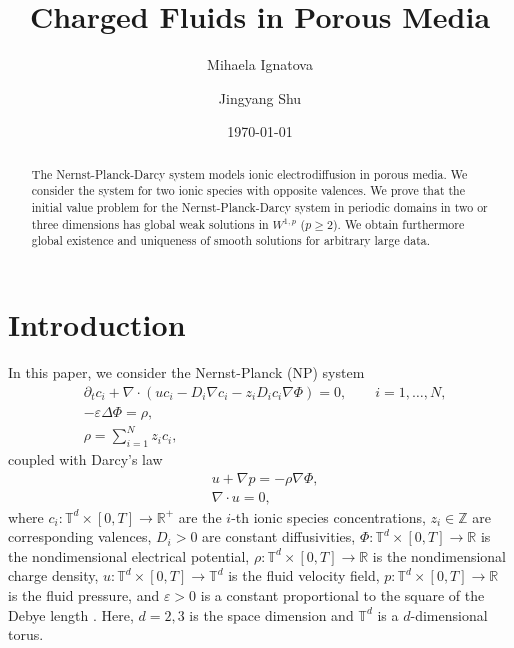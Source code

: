 \documentclass[10pt,twoside,reqno]{amsart}
\title[The Nernst-Planck-Darcy System]{Charged Fluids in Porous Media}
\date{\today}
\author{Mihaela Ignatova}
\author{Jingyang Shu}
\numberwithin{figure}{section}
\numberwithin{equation}{section}
\theoremstyle{definition}
\newcommand{\1}{\mathbbm{1}}
\newcommand{\pt}{\partial_t}
\newcommand{\R}{\mathbb{R}}
\newcommand{\T}{\mathbb{T}}
\newcommand{\ve}{\varepsilon}
\newcommand{\Z}{\mathbb{Z}}
\begin{document}
\begin{abstract}
The Nernst-Planck-Darcy system models ionic electrodiffusion in porous media. We consider the system for two ionic species with opposite valences. We prove that the initial value problem for the Nernst-Planck-Darcy system in periodic domains in two or three dimensions has global weak solutions in $W^{1, p}$ ($p \geq 2$). We obtain furthermore global existence and uniqueness of smooth solutions for arbitrary large data.
\end{abstract}

\maketitle




\section{Introduction}

In this paper, we consider the Nernst-Planck (NP) system
\begin{align}
& \pt c_i + \nabla \cdot \left(u c_i - D_i \nabla c_i - z_i D_i c_i \nabla \Phi\right) = 0, \qquad i = 1, \dotsc, N, \label{NP}\\
& - \ve \Delta \Phi = \rho, \label{poisson0}\\
& \rho = \sum_{i = 1}^N z_i c_i, \label{charge}
\end{align}
coupled with Darcy's law
\begin{align}
& u + \nabla p = - \rho \nabla \Phi, \label{darcy0}\\
& \nabla \cdot u = 0, \label{incomp0}
\end{align}
where $c_i \colon \T^d \times [0, T] \to \R^+$ are the $i$-th ionic species concentrations, $z_i \in \Z$ are corresponding valences, $D_i > 0$ are constant diffusivities, $\Phi \colon \T^d \times [0, T] \to \R$ is the nondimensional electrical potential, $\rho \colon \T^d \times [0, T] \to \R$ is the nondimensional charge density, $u \colon \T^d \times [0, T] \to \T^d$ is the fluid velocity field, $p \colon \T^d \times [0, T] \to \R$ is the fluid pressure, and $\ve > 0$ is a constant proportional to the square of the Debye length \cite{CI19,Rub90}. Here, $d = 2, 3$ is the space dimension and $\T^d$ is a $d$-dimensional torus.
\end{document}
